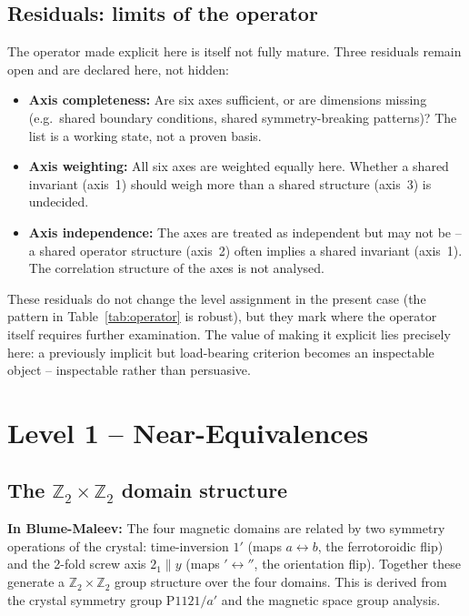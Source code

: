 \subsection{Residuals: limits of the operator}

The operator made explicit here is itself not fully mature. Three
residuals remain open and are declared here, not hidden:

\begin{itemize}
  \item \textbf{Axis completeness:} Are six axes sufficient, or are
        dimensions missing (e.g.\ shared boundary conditions, shared
        symmetry-breaking patterns)? The list is a working state, not a
        proven basis.
  \item \textbf{Axis weighting:} All six axes are weighted equally here.
        Whether a shared invariant (axis~1) should weigh more than a
        shared structure (axis~3) is undecided.
  \item \textbf{Axis independence:} The axes are treated as independent
        but may not be -- a shared operator structure (axis~2) often
        implies a shared invariant (axis~1). The correlation structure of
        the axes is not analysed.
\end{itemize}

These residuals do not change the level assignment in the present case
(the pattern in Table~\ref{tab:operator} is robust), but they mark where
the operator itself requires further examination. The value of making it
explicit lies precisely here: a previously implicit but load-bearing
criterion becomes an inspectable object -- inspectable rather than
persuasive.

\section{Level 1 -- Near-Equivalences}

\subsection{The $\mathbb{Z}_2\times\mathbb{Z}_2$ domain structure}

\textbf{In Blume-Maleev:} The four magnetic domains are related by two
symmetry operations of the crystal: time-inversion $1'$ (maps $a \leftrightarrow
b$, the ferrotoroidic flip) and the 2-fold screw axis $2_1\|y$ (maps
$'\leftrightarrow''$, the orientation flip). Together these generate a
$\mathbb{Z}_2\times\mathbb{Z}_2$ group structure over the four domains.
This is derived from the crystal symmetry group P$1121/a'$ and the
magnetic space group analysis.

